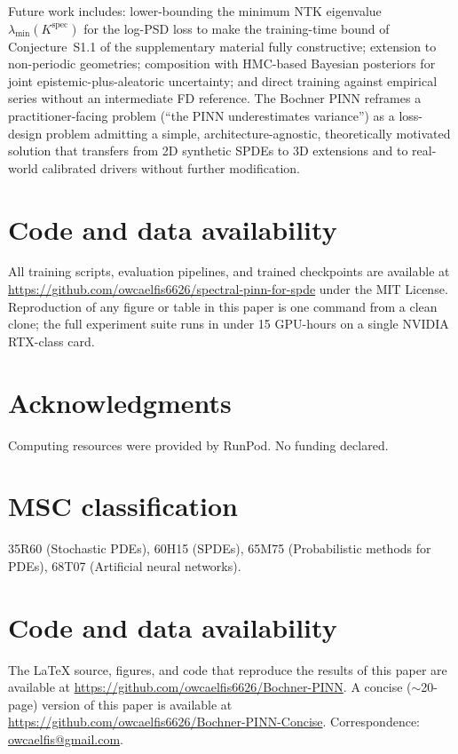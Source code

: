 \documentclass[review,12pt]{elsarticle}
\begin{document}
Future work includes: lower-bounding the minimum NTK eigenvalue
$\lambda_{\min}(K^{\mathrm{spec}})$ for the log-PSD loss to make the
training-time bound of Conjecture~S1.1 of the supplementary material fully constructive;
extension to non-periodic geometries; composition with HMC-based
Bayesian posteriors for joint epistemic-plus-aleatoric uncertainty;
and direct training against empirical series without an intermediate FD
reference. The Bochner PINN reframes a practitioner-facing problem
(``the PINN underestimates variance'') as a loss-design problem
admitting a simple, architecture-agnostic, theoretically motivated
solution that transfers from 2D synthetic SPDEs to 3D extensions and
to real-world calibrated drivers without further modification.

\section*{Code and data availability}

All training scripts, evaluation pipelines, and trained checkpoints
are available at
\url{https://github.com/owcaelfis6626/spectral-pinn-for-spde} under the
MIT License. Reproduction of any figure or table in this paper is
one command from a clean clone; the full experiment suite runs in
under 15 GPU-hours on a single NVIDIA RTX-class card.

\section*{Acknowledgments}

Computing resources were provided by RunPod. No funding declared.

\section*{MSC classification}

35R60 (Stochastic PDEs), 60H15 (SPDEs), 65M75 (Probabilistic
methods for PDEs), 68T07 (Artificial neural networks).


\section*{Code and data availability}
The \LaTeX{} source, figures, and code that reproduce the results of this paper are
available at \url{https://github.com/owcaelfis6626/Bochner-PINN}. A concise
($\sim$20-page) version of this paper is available at
\url{https://github.com/owcaelfis6626/Bochner-PINN-Concise}.
Correspondence: \href{mailto:owcaelfis@gmail.com}{owcaelfis@gmail.com}.



\end{document}

